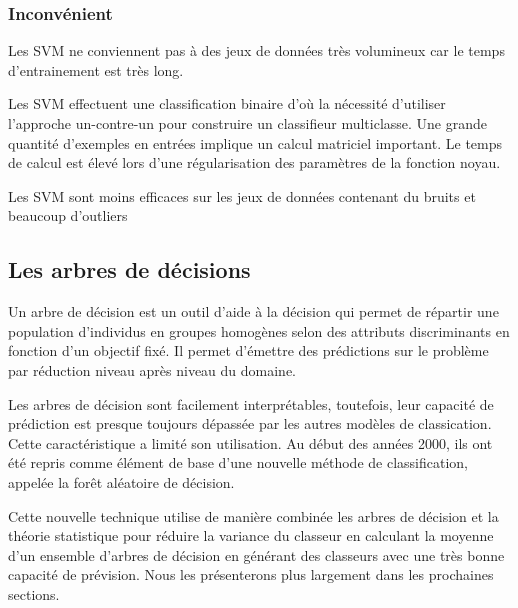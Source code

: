 \subsubsection{Inconvénient}
Les SVM ne conviennent pas à des jeux de données très volumineux car le temps
d'entrainement est très long.

  Les SVM effectuent une classification binaire d’où la nécessité d’utiliser 
l’approche un-contre-un pour construire un classifieur multiclasse.
Une grande quantité d’exemples en entrées implique un calcul matriciel important.
Le temps de calcul est élevé lors d’une régularisation des paramètres de la 
fonction noyau. 

Les SVM sont moins efficaces sur les jeux de données contenant
du bruits et beaucoup d’outliers

 \subsection{Les arbres de décisions}
Un arbre de décision est un outil d’aide à la décision qui permet de
répartir une population d’individus en groupes homogènes selon des attributs
discriminants en fonction d’un objectif fixé. Il permet d'émettre des
prédictions sur le problème par réduction niveau après niveau du domaine.

Les arbres de décision sont facilement interprétables, toutefois, leur capacité de
prédiction est presque toujours dépassée par les autres modèles de classication. 
Cette caractéristique a limité son utilisation. Au début des années 2000,
ils ont été repris comme élément de base d'une nouvelle méthode de
classification, appelée la forêt aléatoire de décision.

Cette nouvelle technique utilise de manière combinée les arbres de
décision et la théorie statistique pour réduire la variance du classeur en calculant la
moyenne d'un ensemble d'arbres de décision en générant des classeurs avec une très
bonne capacité de prévision. Nous les présenterons plus largement dans les
prochaines sections.

